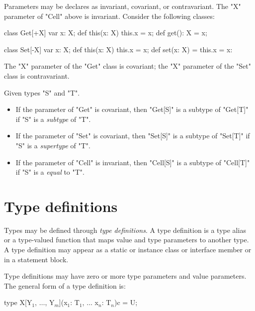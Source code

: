 Parameters may be declares as invariant, covariant, or
contravariant.  The \xcd"X" parameter of \xcd"Cell" above is
invariant.  
Consider the following classes:
\begin{xten}
class Get[+X] {
    var x: X;
    def this(x: X) { this.x = x; }
    def get(): X = x;
}

class Set[-X] {
    var x: X;
    def this(x: X) { this.x = x; }
    def set(x: X) = { this.x = x: }
}
\end{xten}
The \xcd"X" parameter of the \xcd"Get" class is covariant;
the \xcd"X" parameter of the \xcd"Set" class is contravariant.

Given types \xcd"S" and \xcd"T".
\begin{itemize}
\item
If the parameter of \xcd"Get" is covariant, then
\xcd"Get[S]" is a subtype of \xcd"Get[T]" if
\xcd"S" is a {\em subtype} of \xcd"T".

\item
If the parameter of \xcd"Set" is covariant, then
\xcd"Set[S]" is a subtype of \xcd"Set[T]" if
\xcd"S" is a {\em supertype} of \xcd"T".

\item
If the parameter of \xcd"Cell" is invariant, then
\xcd"Cell[S]" is a subtype of \xcd"Cell[T]" if
\xcd"S" is a {\em equal} to \xcd"T".
\end{itemize}

\fi



\section{Type definitions}
\label{TypeDefs}


        Types may be defined through {\em type definitions}.
        A type definition is a type alias or a type-valued function
        that maps value and type parameters to another type.
        A type definition may appear as a static or instance
        class or interface
        member or in a statement block.

        Type definitions may have zero or more type parameters
        and value parameters.
The general form of a type definition is:

\begin{xtenmath}
type X[Y$_1$, $\dots$, Y$_m$](x$_1$: T$_1$, $\dots$ x$_n$: T$_n$){c} = U;
\end{xtenmath}

